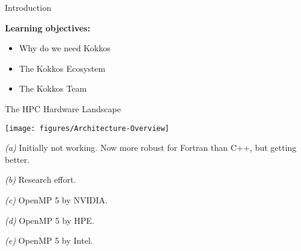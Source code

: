 



\ifnotoverview
\begin{frame}[fragile]

  \vspace{-10pt}

  {\Huge Introduction}

  \vspace{10pt}

  \textbf{Learning objectives:}
  \begin{itemize}
    \item{Why do we need Kokkos}
    \item{The Kokkos Ecosystem}
    \item{The Kokkos Team}
  \end{itemize}

  \vspace{-20pt}

\end{frame}
\fi

\begin{frame}[fragile]{The HPC Hardware Landscape}
  \begin{center}
    \texttt{[image: figures/Architecture-Overview]}
  \end{center}

  \begin{scriptsize}
  \emph{(a)} Initially not working. Now more robust for Fortran than C++, but getting better.

  \emph{(b)} Research effort.

  \emph{(c)} OpenMP 5 by NVIDIA.

  \emph{(d)} OpenMP 5 by HPE.

  \emph{(e)} OpenMP 5 by Intel.
  \end{scriptsize}

\end{frame}

